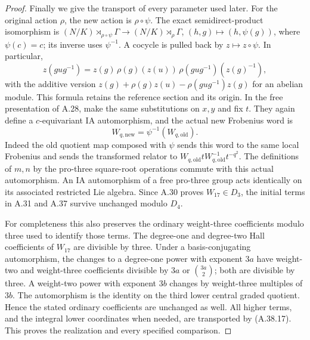 \begin{proof}
Finally we give the transport of every parameter used later.
For the original action $\rho$, the new action is $\rho\circ\psi$.
The exact semidirect-product isomorphism is
$ (N/K)\rtimes_{\rho\circ\psi}\Gamma\to
 (N/K)\rtimes_\rho\Gamma$, $(h,g)\mapsto(h,\psi(g))$,
where $\psi(c)=c$; its inverse uses $\psi^{-1}$.
A cocycle is pulled back by $z\mapsto z\circ\psi$. In particular,
\[
 z(gug^{-1})=
 z(g)\,\rho(g)(z(u))\,
       \rho(gug^{-1})(z(g)^{-1}),
 \tag{A.38.16}
\]
with the additive version
$z(g)+\rho(g)z(u)-\rho(gug^{-1})z(g)$ for an abelian module.
This formula retains the reference section and its origin.
In the free presentation of A.28, make the same substitutions
on $x,y$ and fix $t$. They again define a $c$-equivariant IA
automorphism, and the actual new Frobenius word is
\[
 W_{q,\mathrm{new}}=\psi^{-1}(W_{q,\mathrm{old}}).
 \tag{A.38.17}
\]
Indeed the old quotient map composed with $\psi$ sends this
word to the same local Frobenius and sends the transformed
relator to $W_{q,\mathrm{old}}tW_{q,\mathrm{old}}^{-1}t^{-q^2}$.
The definitions of $m,n$ by the pro-three square-root operations
commute with this actual automorphism. An IA automorphism of
a free pro-three group acts identically on its associated
restricted Lie algebra. Since A.30 proves $W_{17}\in D_3$,
the initial terms in A.31 and A.37 survive unchanged modulo
$D_4$.

For completeness this also preserves the ordinary weight-three
coefficients modulo three used to identify those terms.
The degree-one and degree-two Hall coefficients of $W_{17}$
are divisible by three. Under a basis-conjugating automorphism,
the changes to a degree-one power with exponent $3a$ have
weight-two and weight-three coefficients divisible by $3a$
or $\binom{3a}{2}$; both are divisible by three. A weight-two
power with exponent $3b$ changes by weight-three multiples
of $3b$. The automorphism is the identity on the third lower
central graded quotient. Hence the stated ordinary coefficients
are unchanged as well. All higher terms, and the integral
lower coordinates when needed, are transported by (A.38.17).
This proves the realization and every specified comparison.
\end{proof}

